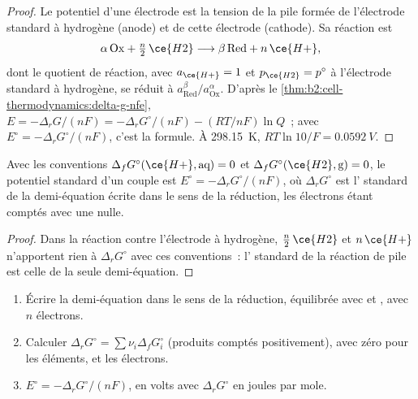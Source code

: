\begin{proof}
Le potentiel d'une électrode est la tension de la pile formée de l'électrode standard à
hydrogène (anode) et de cette électrode (cathode). Sa réaction est
\[
  \alpha\,\mathrm{Ox} + \tfrac n2\,\ce{H2} \longrightarrow \beta\,\mathrm{Red} + n\,\ce{H+} ,
\]
dont le quotient de réaction, avec $a_{\ce{H+}} = 1$ et $p_{\ce{H2}} = p^\circ$ à
l'électrode standard à hydrogène, se réduit à $a_{\mathrm{Red}}^\beta/
a_{\mathrm{Ox}}^\alpha$. D'après le \cref{thm:b2:cell-thermodynamics:delta-g-nfe},
$E = -\Delta_r G/(nF) = -\Delta_r G^\circ/(nF) - (RT/nF)\ln Q$~; avec $E^\circ =
-\Delta_r G^\circ/(nF)$, c'est la formule. À \qty{298.15}{K}, $RT\ln 10/F =
\qty{0.0592}{V}$.
\end{proof}

\begin{proposition}\label{prop:b2:cell-thermodynamics:standard-potential}
Avec les conventions $\Delta_f G^\circ(\ce{H+}, \text{aq}) = 0$ et
$\Delta_f G^\circ(\ce{H2}, \text{g}) = 0$, le potentiel standard d'un couple est
$E^\circ = -\Delta_r G^\circ/(nF)$, où $\Delta_r G^\circ$ est l'
standard de la demi-équation écrite dans le sens de la réduction, les électrons étant comptés
avec une  nulle.
\end{proposition}

\begin{proof}
Dans la réaction contre l'électrode à hydrogène, $\tfrac n2\,\ce{H2}$ et
$n\,\ce{H+}$ n'apportent rien à $\Delta_r G^\circ$ avec ces conventions~: l' standard de la réaction de pile est celle de la seule demi-équation.
\end{proof}

\begin{method}\label{met:b2:cell-thermodynamics:e-from-gibbs}
\begin{enumerate}
  \item Écrire la demi-équation dans le sens de la réduction, équilibrée avec  et
        , avec $n$ électrons.
  \item Calculer $\Delta_r G^\circ = \sum\nu_i\Delta_f G^\circ_i$ (produits
        comptés positivement), avec zéro pour les éléments,  et les électrons.
  \item $E^\circ = -\Delta_r G^\circ/(nF)$, en volts avec $\Delta_r G^\circ$ en
        joules par mole.
\end{enumerate}
\end{method}

